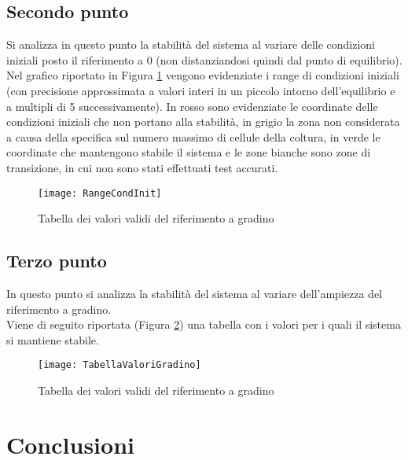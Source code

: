 \documentclass[a4paper, 11pt]{article}
\begin{document}
\subsection{Secondo punto}
Si analizza in questo punto la stabilità del sistema al variare delle condizioni iniziali posto il riferimento a 0 (non distanziandosi quindi dal punto di equilibrio).
Nel grafico riportato in Figura \ref{Figura 12} vengono evidenziate i range di condizioni iniziali (con precisione approssimata a valori interi in un piccolo intorno dell'equilibrio e a multipli di 5 successivamente). In rosso sono evidenziate le coordinate delle condizioni iniziali che non portano alla stabilità, in grigio la zona non considerata a causa della specifica sul numero massimo di cellule della coltura, in verde le coordinate che mantengono stabile il sistema e le zone bianche sono zone di transizione, in cui non sono stati effettuati test accurati.
\\
 \begin{figure}[H]
 	\centering
 	\texttt{[image: RangeCondInit]}
 	\caption[]{Tabella dei valori validi del riferimento a gradino}
 	\label{Figura 12}
 \end{figure}


\subsection{Terzo punto}

In questo punto si analizza la stabilità del sistema al variare dell'ampiezza del riferimento a gradino.
\\
Viene di seguito riportata (Figura \ref{Figura 13}) una tabella con i valori per i quali il sistema si mantiene stabile. 
\begin{figure}[H]
	\centering
	\texttt{[image: TabellaValoriGradino]}
	\caption[]{Tabella dei valori validi del riferimento a gradino}
	\label{Figura 13}
\end{figure}
\section{Conclusioni}
\end{document}
